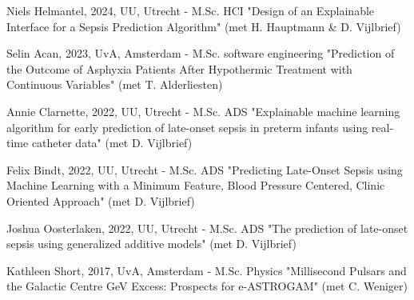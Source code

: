 \item Niels Helmantel, 2024, UU, Utrecht - M.Sc. HCI "Design of an Explainable Interface for a Sepsis Prediction Algorithm" (met H. Hauptmann \& D. Vijlbrief)
\item Selin Acan, 2023, UvA, Amsterdam - M.Sc. software engineering "Prediction of the Outcome of Asphyxia Patients After Hypothermic Treatment with Continuous Variables" (met T. Alderliesten)
\item Annie Clarnette, 2022, UU, Utrecht - M.Sc. ADS "Explainable machine learning algorithm for early prediction of late-onset sepsis in preterm infants using real-time catheter data" (met D. Vijlbrief)
\item Felix Bindt, 2022, UU, Utrecht - M.Sc. ADS "Predicting Late-Onset Sepsis using Machine Learning with a Minimum Feature, Blood Pressure Centered, Clinic Oriented Approach" (met D. Vijlbrief)
\item Joshua Oosterlaken, 2022, UU, Utrecht - M.Sc. ADS "The prediction of late-onset sepsis using generalized additive models" (met D. Vijlbrief)
\item Kathleen Short, 2017, UvA, Amsterdam - M.Sc. Physics "Millisecond Pulsars and the Galactic Centre GeV Excess: Prospects for e-ASTROGAM" (met C. Weniger) 
